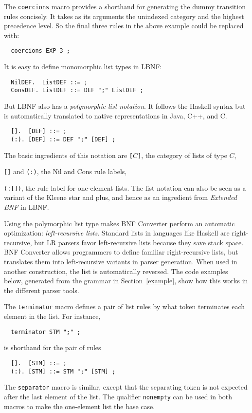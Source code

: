 The {\tt coercions} macro provides a shorthand for 
generating the dummy transition rules concisely. It takes as its
arguments the unindexed category and the highest precedence level. So the final three rules in the above example could be replaced with:
\begin{verbatim}
  coercions EXP 3 ;
\end{verbatim}


It is easy to define monomorphic list types in LBNF:
\begin{verbatim}
  NilDEF.  ListDEF ::= ;
  ConsDEF. ListDEF ::= DEF ";" ListDEF ;
\end{verbatim}
But LBNF also has a \textit{polymorphic list notation}. It follows the
Haskell syntax but is automatically translated to native representations
in Java, C++, and C.
\begin{verbatim}
  [].  [DEF] ::= ;
  (:). [DEF] ::= DEF ";" [DEF] ;
\end{verbatim}
The basic ingredients of this notation are
\bequ
{\tt[}$C${\tt ]}, the category of lists of type $C$,
 
{\tt []} and {\tt (:)}, the Nil and Cons rule labels,

{\tt (:[])}, the rule label for one-element lists. 
\enqu
The list notation can also be seen as a variant of the 
Kleene star and plus, and hence as an ingredient from \textit{Extended BNF} in LBNF.

\label{leftrec}

Using the polymorphic list type makes BNF Converter perform
an automatic optimization: \textit{left-recursive lists}. 
Standard lists in
languages like Haskell are right-recursive, but
LR parsers favor left-recursive lists because they save 
stack space. 
BNF Converter allows programmers to define familiar 
right-recursive lists, but translates them into 
left-recursive variants in parser generation.
When used in another construction, the list is automatically 
reversed. The code examples below, generated from the grammar in
Section~\ref{example}, show how this works in the different parser tools.


\label{lists}

The {\tt terminator} macro defines a pair of list rules by what
token terminates each element in the list. For instance,
\begin{verbatim}
  terminator STM ";" ;
\end{verbatim}
is shorthand for the pair of rules
\begin{verbatim}
  [].  [STM] ::= ;
  (:). [STM] ::= STM ";" [STM] ;
\end{verbatim}
The {\tt separator} macro is similar,
except that the separating token is not expected after the last
element of the list. 
The qualifier {\tt nonempty} can be used in both macros to 
make the one-element list the base case. 




